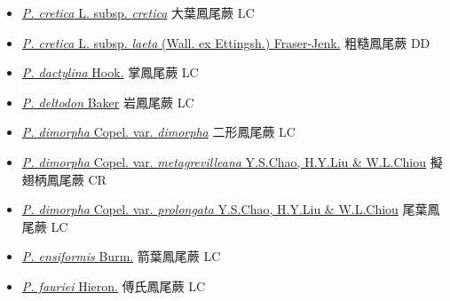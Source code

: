 \begin{itemize}
\begin{itemize}
        \item[] \href{http://www.theplantlist.org/tpl1.1/search?q=Pteris+cretica+subsp.+cretica}{\textit{P. cretica} L. subsp. \textit{cretica}}   大葉鳳尾蕨 LC
        \item[] \href{http://www.theplantlist.org/tpl1.1/search?q=Pteris+cretica+subsp.+laeta}{\textit{P. cretica} L. subsp. \textit{laeta} (Wall. ex Ettingsh.) Fraser-Jenk.}   粗糙鳳尾蕨 DD
        \item[] \href{http://www.theplantlist.org/tpl1.1/search?q=Pteris+dactylina}{\textit{P. dactylina} Hook.}   掌鳳尾蕨 LC
        \item[] \href{http://www.theplantlist.org/tpl1.1/search?q=Pteris+deltodon}{\textit{P. deltodon} Baker}   岩鳳尾蕨 LC
        \item[] \href{http://www.theplantlist.org/tpl1.1/search?q=Pteris+dimorpha+var.+dimorpha}{\textit{P. dimorpha} Copel. var. \textit{dimorpha}}   二形鳳尾蕨 LC
        \item[] \href{http://www.theplantlist.org/tpl1.1/search?q=Pteris+dimorpha+var.+metagrevilleana}{\textit{P. dimorpha} Copel. var. \textit{metagrevilleana} Y.S.Chao, H.Y.Liu \& W.L.Chiou}   擬翅柄鳳尾蕨 CR
        \item[] \href{http://www.theplantlist.org/tpl1.1/search?q=Pteris+dimorpha+var.+prolongata}{\textit{P. dimorpha} Copel. var. \textit{prolongata} Y.S.Chao, H.Y.Liu \& W.L.Chiou}   尾葉鳳尾蕨 LC
        \item[] \href{http://www.theplantlist.org/tpl1.1/search?q=Pteris+ensiformis}{\textit{P. ensiformis} Burm.}   箭葉鳳尾蕨 LC
        \item[] \href{http://www.theplantlist.org/tpl1.1/search?q=Pteris+fauriei}{\textit{P. fauriei} Hieron.}   傅氏鳳尾蕨 LC

\end{itemize}
\end{itemize}
